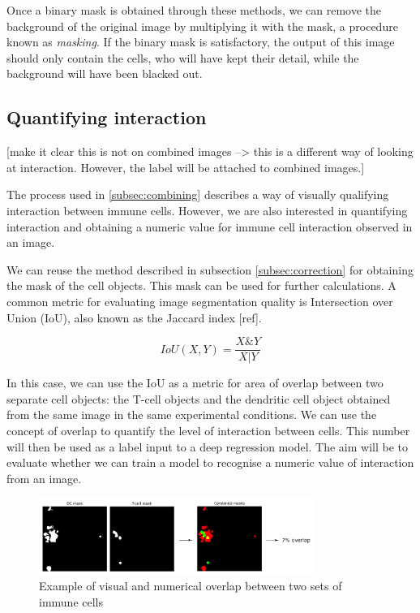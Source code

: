 Once a binary mask is obtained through these methods, we can remove the background of the original image by multiplying it with the mask, a procedure known as \textit{masking}. If the binary mask is satisfactory, the output of this image should only contain the cells, who will have kept their detail, while the background will have been blacked out.

\subsection{Quantifying interaction}

[make it clear this is not on combined images --> this is a different way of looking at interaction. However, the label will be attached to combined images.]

The process used in \autoref{subsec:combining} describes a way of visually qualifying interaction between immune cells. However, we are also interested in quantifying interaction and obtaining a numeric value for immune cell interaction observed in an image.

We can reuse the method described in subsection \ref{subsec:correction} for obtaining the mask of the cell objects. This mask can be used for further calculations. A common metric for evaluating image segmentation quality is Intersection over Union (IoU), also known as the Jaccard index [ref].

\begin{equation}
    IoU(X,Y) = \frac{X \& Y}{X | Y}
\end{equation}

In this case, we can use the IoU as a metric for area of overlap between two separate cell objects: the T-cell objects and the dendritic cell object obtained from the same image in the same experimental conditions. We can use the concept of overlap to quantify the level of interaction between cells. This number will then be used as a label input to a deep regression model. The aim will be to evaluate whether we can train a model to recognise a numeric value of interaction from an image.

\begin{figure}
    \centering
    \includegraphics[width=0.8\textwidth]{dissertation/figures/mask_overlap_operation.png}
    \caption{Example of visual and numerical overlap between two sets of immune cells}
    \label{fig:mask_overlap}
\end{figure}

